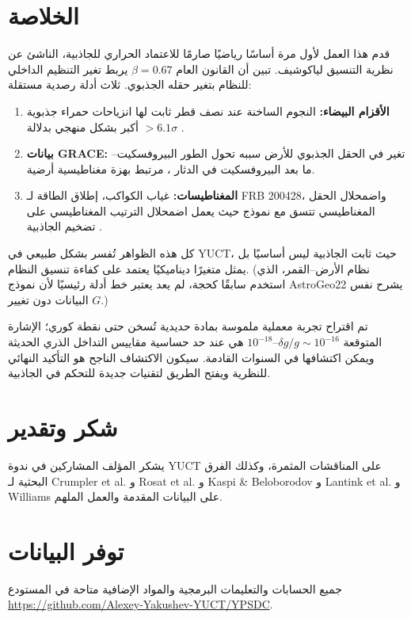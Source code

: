 \documentclass[11pt,a4paper]{article}
\begin{document}
	\section{الخلاصة}
	\label{sec:conclusion}
	
	قدم هذا العمل لأول مرة أساسًا رياضيًا صارمًا للاعتماد الحراري للجاذبية، الناشئ عن نظرية التنسيق لياكوشيف. تبين أن القانون العام $\beta = 0.67$ يربط تغير التنظيم الداخلي للنظام بتغير حقله الجذبوي. ثلاث أدلة رصدية مستقلة:
	\begin{enumerate}
		\item \textbf{الأقزام البيضاء:} النجوم الساخنة عند نصف قطر ثابت لها انزياحات حمراء جذبوية أكبر بشكل منهجي بدلالة $>6.1\sigma$ \cite{Crumpler2024}.
		\item \textbf{بيانات GRACE:} تغير في الحقل الجذبوي للأرض سببه تحول الطور البيروفسكيت–ما بعد البيروفسكيت في الدثار \cite{Rosat2025}، مرتبط بهزة مغناطيسية أرضية.
		\item \textbf{المغناطيسات:} غياب الكواكب، إطلاق الطاقة لـ FRB 200428، واضمحلال الحقل المغناطيسي تتسق مع نموذج حيث يعمل اضمحلال الترتيب المغناطيسي على تضخيم الجاذبية \cite{Kaspi2017, Geng2020}.
	\end{enumerate}
	كل هذه الظواهر تُفسر بشكل طبيعي في YUCT، حيث ثابت الجاذبية ليس أساسيًا بل يمثل متغيرًا ديناميكيًا يعتمد على كفاءة تنسيق النظام. (نظام الأرض–القمر، الذي استخدم سابقًا كحجة، لم يعد يعتبر خط أدلة رئيسيًا لأن نموذج AstroGeo22 يشرح نفس البيانات دون تغيير $G$.)
	
	تم اقتراح تجربة معملية ملموسة بمادة حديدية تُسخن حتى نقطة كوري؛ الإشارة المتوقعة $\delta g/g \sim 10^{-16}$–$10^{-18}$ هي عند حد حساسية مقاييس التداخل الذري الحديثة ويمكن اكتشافها في السنوات القادمة. سيكون الاكتشاف الناجح هو التأكيد النهائي للنظرية ويفتح الطريق لتقنيات جديدة للتحكم في الجاذبية.
	
	\section*{شكر وتقدير}
	يشكر المؤلف المشاركين في ندوة YUCT على المناقشات المثمرة، وكذلك الفرق البحثية لـ Crumpler et al. و Rosat et al. و Kaspi \& Beloborodov و Lantink et al. و Williams على البيانات المقدمة والعمل الملهم.
	
	\section*{توفر البيانات}
	جميع الحسابات والتعليمات البرمجية والمواد الإضافية متاحة في المستودع \url{https://github.com/Alexey-Yakushev-YUCT/YPSDC}.
	
\end{document}
